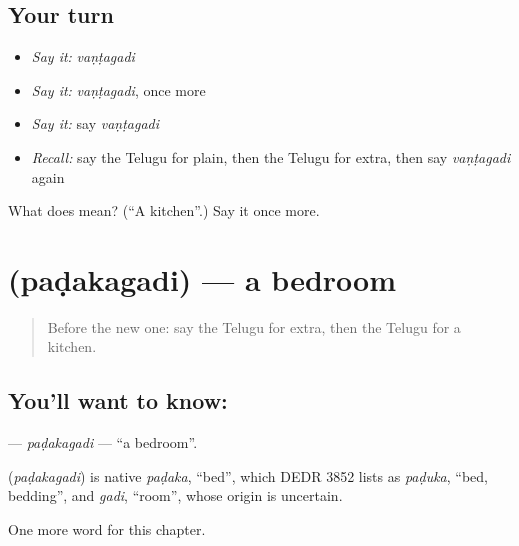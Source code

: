 \subsection*{Your turn}
\begin{itemize}
\raggedright
  \item \emph{Say it:} \emph{vaṇṭagadi}
  \item \emph{Say it:} \emph{vaṇṭagadi}, once more
  \item \emph{Say it:} say \emph{vaṇṭagadi}
  \item \emph{Recall:} say the Telugu for plain, then the Telugu for extra, then say \emph{vaṇṭagadi} again
\end{itemize}

\begin{tcolorbox}[breakable,colback=teal!4,colframe=teal!35!black,title={Before you move on}]
What does  mean? (\textquotedblleft{}A kitchen\textquotedblright{}.) Say it once more.
\end{tcolorbox}
\section[\texorpdfstring{\te{పడకగది} (paḍakagadi)}{పడకగది (paḍakagadi)}]{ (paḍakagadi) — a bedroom}

\label{lesson:TE-C183-padakagadi}



\begin{quote}
Before the new one: say the Telugu for extra, then the Telugu for a kitchen.
\end{quote}

\subsection*{You'll want to know: }
\textbf{} — \emph{paḍakagadi} — \textquotedblleft{}a bedroom\textquotedblright{}.

\begin{cousinweb}
\textbf{} (\emph{paḍakagadi}) is native \emph{paḍaka}, \textquotedblleft{}bed\textquotedblright{}, which DEDR 3852 lists as \emph{paḍuka}, \textquotedblleft{}bed, bedding\textquotedblright{}, and \emph{gadi}, \textquotedblleft{}room\textquotedblright{}, whose origin is uncertain.
\end{cousinweb}

\begin{grammarlens}[title={What you've built}]
One more word for this chapter.
\end{grammarlens}

